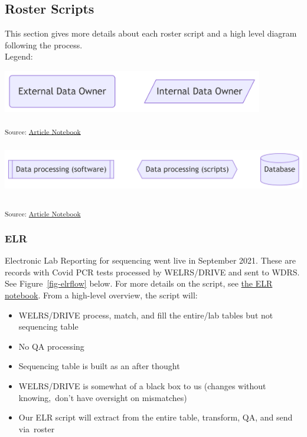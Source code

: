 \documentclass[
]{agujournal2019}
\providecommand{\tightlist}{%
  \setlength{\itemsep}{0pt}\setlength{\parskip}{0pt}}\usepackage{longtable,booktabs,array}
\begin{document}
\subsection{Roster Scripts}\label{sec-ecosystem}

This section gives more details about each roster script and a high
level diagram following the process.\\

Legend:

\includegraphics[width=4.49in,height=0.73in]{index_files/figure-latex/mermaid-figure-18.png}

\textsubscript{Source:
\href{https://NW-PaGe.github.io/sequencing_integration_pipeline1.0/index.qmd.html}{Article
Notebook}}

\includegraphics[width=6.56in,height=0.88in]{index_files/figure-latex/mermaid-figure-17.png}

\textsubscript{Source:
\href{https://NW-PaGe.github.io/sequencing_integration_pipeline1.0/index.qmd.html}{Article
Notebook}}

\subsubsection{ELR}\label{sec-elr}

Electronic Lab Reporting for sequencing went live in September 2021.
These are records with Covid PCR tests processed by WELRS/DRIVE and sent
to WDRS\hspace{0pt}. See Figure~\ref{fig-elrflow} below. For more
details on the script, see \href{notebooks/elr.Rmd}{the ELR notebook}.
From a high-level overview, the script will:

\begin{itemize}
\tightlist
\item
  WELRS/DRIVE process, match, and fill the entire/lab tables but not
  sequencing table\hspace{0pt}
\item
  No QA processing\hspace{0pt}
\item
  Sequencing table is built as an after thought\hspace{0pt}
\item
  WELRS/DRIVE is somewhat of a black box to us (changes without
  knowing,~don't have oversight on mismatches)\hspace{0pt}
\item
  Our ELR script will extract from the entire table, transform, QA, and
  send via~roster\hspace{0pt}
\end{itemize}
\end{document}
